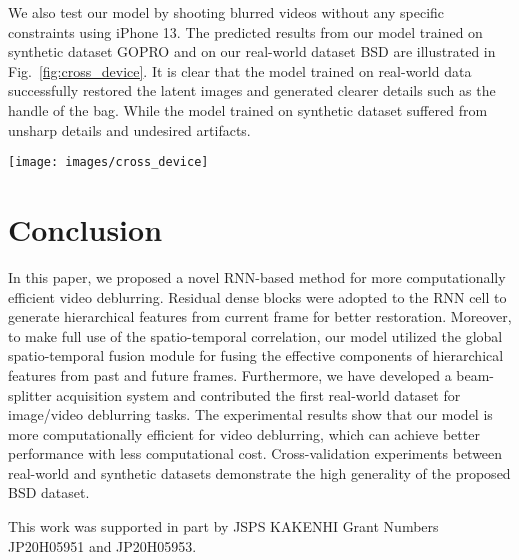\documentclass[twocolumn]{svjour3}          \smartqed  \usepackage{graphicx}
\begin{document}
We also test our model by shooting blurred videos without any specific constraints using iPhone 13. The predicted results from our model trained on synthetic dataset GOPRO and on our real-world dataset BSD are illustrated in Fig.~\ref{fig:cross_device}. It is clear that the model trained on real-world data successfully restored the latent images and generated clearer details such as the handle of the bag. While the model trained on synthetic dataset suffered from unsharp details and undesired artifacts.

\begin{figure*}[ht]
	\centering
\texttt{[image: images/cross\_device]}
	\caption{Testing on real-world blurry videos from iPhone 13. Ours (Synthetic) denotes the results of ESTRNN trained on synthetic dataset GOPRO. Ours (real) denotes the results of ESTRNN trained on real-world dataset BSD (2ms-16ms).}
	\label{fig:cross_device}
\end{figure*}

\section{Conclusion}
In this paper, we proposed a novel RNN-based method for more computationally efficient video deblurring. Residual dense blocks were adopted to the RNN cell to generate hierarchical features from current frame for better restoration. Moreover, to make full use of the spatio-temporal correlation, our model utilized the global spatio-temporal fusion module for fusing the effective components of hierarchical features from past and future frames. Furthermore, we have developed a beam-splitter acquisition system and contributed the first real-world dataset for image/video deblurring tasks. The experimental results show that our model is more computationally efficient for video deblurring, which can achieve better performance with less computational cost. Cross-validation experiments between real-world and synthetic datasets demonstrate the high generality of the proposed BSD dataset.

\begin{acknowledgements}
This work was supported in part by JSPS KAKENHI Grant Numbers JP20H05951 and JP20H05953.
\end{acknowledgements}





         
\end{document}
